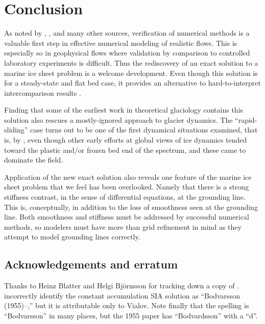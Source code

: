 \documentclass[review,letterpaper]{igs}
\begin{document}
\section{Conclusion}  As noted by \cite{BLKCB}, \cite{Wesseling}, and many other sources, verification of numerical methods is a valuable first step in effective numerical modeling of realistic flows.  This is especially so in geophysical flows where validation by comparison to controlled laboratory experiments is difficult.  Thus the rediscovery of an exact solution to a marine ice sheet problem is a welcome development.  Even though this solution is for a steady-state and flat bed case, it provides an alternative to hard-to-interpret intercomparison results \citep{MISMIP2012}.

Finding that some of the earliest work in theoretical glaciology contains this solution also rescues a mostly-ignored approach to glacier dynamics.  The ``rapid-sliding'' case turns out to be one of the first dynamical situations examined, that is, by \cite{Bodvardsson}, even though other early efforts at global views of ice dynamics tended toward the plastic \citep{Orowan,Nye} and/or frozen bed \citep{Vialov} end of the spectrum, and these came to dominate the field.

Application of the new exact solution also reveals one feature of the marine ice sheet problem that we feel has been overlooked.  Namely that there is a strong stiffness contrast, in the sense of differential equations, at the grounding line.  This is, conceptually, in addition to the loss of smoothness seen at the grounding line.  Both smoothness and stiffness must be addressed by successful numerical methods, so modelers must have more than grid refinement in mind as they attempt to model grounding lines correctly.



\subsection*{Acknowledgements and erratum}  Thanks to Heinz Blatter and Helgi Bj\"ornsson for tracking down a copy of \cite{Bodvardsson}.  \cite{BLKCB} incorrectly identify the constant accumulation SIA solution as ``Bodvarsson (1955)--\cite{Vialov},'' but it is attributable only to Vialov.  Note finally that the spelling is ``Bodvarsson'' in many places, but the 1955 paper has ``Bodvardsson'' with a ``d''.




\end{document}
